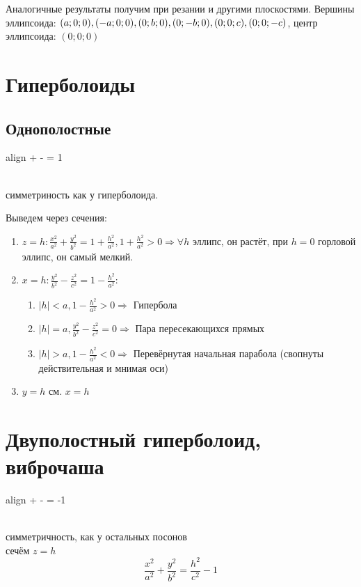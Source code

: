 \documentclass[oneside]{book}
\newcommand{\boxedeq}[2]{\begin{empheq}[box={\fboxsep=6pt\fbox}]{align}\label{#1}#2\end{empheq}}
\begin{document}
\begin{itemize}
\begin{enumerate}
\begin{enumerate}
\end{enumerate}

Аналогичные результаты получим при резании и другими плоскостями. Вершины эллипсоида: $(a; 0; 0), (-a; 0; 0), (0;b;0), \\ (0;-b;0), (0;0;c), (0;0;-c)$, центр эллипсоида: $(0;0;0)$

\section{Гиперболоиды}

\subsection{Однополостные}

\boxedeq{eq:*}{ +  - \frac{z^2}{c^2} = 1} \\ симметриность как у гиперболоида.

Выведем через сечения:
\begin{enumerate}
\item $ z = h: \frac{x^2}{a^2} + \frac{y^2}{b^2} = 1 + \frac{h^2}{a^2}, 1 + \frac{h^2}{a^2} > 0 \Rightarrow \forall h $ эллипс, он растёт, при $h = 0$ горловой эллипс, он самый мелкий.
\item $x = h: \frac{y^2}{b^2} - \frac{z^2}{c^2} = 1 - \frac{h^2}{a^2}:$ \begin{enumerate}
    \item $|h| < a, 1 - \frac{h^2}{a^2} > 0 \Rightarrow $ Гипербола
    \item $|h| = a, \frac{y^2}{b^2} - \frac{z^2}{c^2} = 0 \Rightarrow $ Пара пересекающихся прямых
    \item $|h| > a, 1 - \frac{h^2}{a^2} < 0 \Rightarrow $ Перевёрнутая начальная парабола (свопнуты действительная и мнимая оси)
  \end{enumerate}
\item $y = h$ см. $x = h$
\end{enumerate}

\section{Двуполостный гиперболоид, виброчаша}

\boxedeq{eq:*}{ +  - \frac{z^2}{c^2} = -1} \\ симметричность, как у остальных посонов \\
сечём $z = h$
\begin{equation}
\frac{x^2}{a^2} + \frac{y^2}{b^2} = \frac{h^2}{c^2} - 1
\end{equation}
\begin{enumerate}


\end{enumerate}
\end{enumerate}
\end{itemize}
\end{document}
